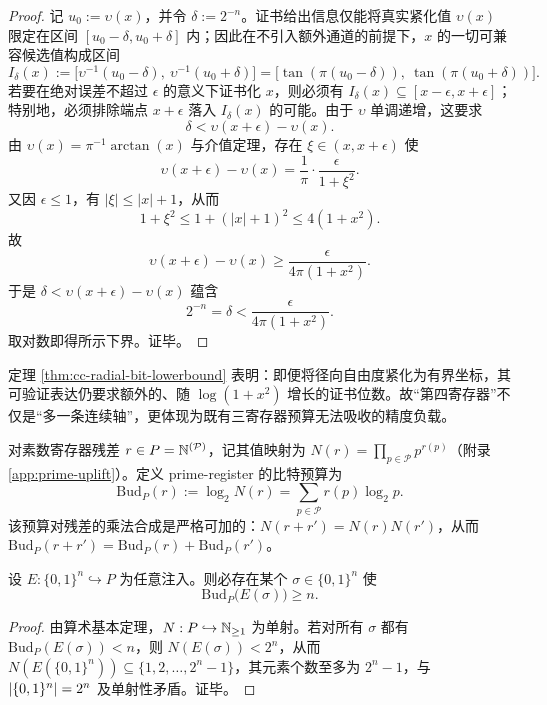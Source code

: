 \begin{proof}
记 $u_0:=\upsilon(x)$，并令 $\delta:=2^{-n}$。证书给出信息仅能将真实紧化值 $\upsilon(x)$ 限定在区间 $[u_0-\delta,u_0+\delta]$ 内；因此在不引入额外通道的前提下，$x$ 的一切可兼容候选值构成区间
$$
I_\delta(x):=\bigl[\upsilon^{-1}(u_0-\delta),\ \upsilon^{-1}(u_0+\delta)\bigr]
=\bigl[\tan(\pi(u_0-\delta)),\ \tan(\pi(u_0+\delta))\bigr].
$$
若要在绝对误差不超过 $\epsilon$ 的意义下证书化 $x$，则必须有 $I_\delta(x)\subseteq[x-\epsilon,x+\epsilon]$；特别地，必须排除端点 $x+\epsilon$ 落入 $I_\delta(x)$ 的可能。由于 $\upsilon$ 单调递增，这要求
$$
\delta < \upsilon(x+\epsilon)-\upsilon(x).
$$
由 $\upsilon(x)=\pi^{-1}\arctan(x)$ 与介值定理，存在 $\xi\in(x,x+\epsilon)$ 使
$$
\upsilon(x+\epsilon)-\upsilon(x)=\frac{1}{\pi}\cdot\frac{\epsilon}{1+\xi^2}.
$$
又因 $\epsilon\le 1$，有 $|\xi|\le |x|+1$，从而
$$
1+\xi^2\le 1+(|x|+1)^2\le 4(1+x^2).
$$
故
$$
\upsilon(x+\epsilon)-\upsilon(x)\ge \frac{\epsilon}{4\pi(1+x^2)}.
$$
于是 $\delta<\upsilon(x+\epsilon)-\upsilon(x)$ 蕴含
$$
2^{-n}=\delta < \frac{\epsilon}{4\pi(1+x^2)}.
$$
取对数即得所示下界。证毕。
\end{proof}

\begin{remark}
定理 \ref{thm:cc-radial-bit-lowerbound} 表明：即便将径向自由度紧化为有界坐标，其可验证表达仍要求额外的、随 $\log(1+x^2)$ 增长的证书位数。故“第四寄存器”不仅是“多一条连续轴”，更体现为既有三寄存器预算无法吸收的精度负载。
\end{remark}

\begin{definition}\label{def:cc-prime-budget}
对素数寄存器残差 $r\in P=\mathbb{N}^{(\mathcal{P})}$，记其值映射为 $N(r)=\prod_{p\in\mathcal{P}}p^{r(p)}$（附录 \ref{app:prime-uplift}）。定义 prime-register 的比特预算为
$$
\mathrm{Bud}_P(r):=\log_2 N(r)=\sum_{p\in\mathcal{P}} r(p)\log_2 p.
$$
该预算对残差的乘法合成是严格可加的：$N(r+r')=N(r)N(r')$，从而 $\mathrm{Bud}_P(r+r')=\mathrm{Bud}_P(r)+\mathrm{Bud}_P(r')$。
\end{definition}

\begin{proposition}[注入编码的容量下界]\label{prop:cc-prime-budget-lowerbound}
设 $E:\{0,1\}^n\hookrightarrow P$ 为任意注入。则必存在某个 $\sigma\in\{0,1\}^n$ 使
$$
\mathrm{Bud}_P\bigl(E(\sigma)\bigr)\ge n.
$$
\end{proposition}

\begin{proof}
由算术基本定理，$N:P\hookrightarrow\mathbb{N}_{\ge 1}$ 为单射。若对所有 $\sigma$ 都有 $\mathrm{Bud}_P(E(\sigma))<n$，则 $N(E(\sigma))<2^n$，从而 $N(E(\{0,1\}^n))\subseteq\{1,2,\dots,2^n-1\}$，其元素个数至多为 $2^n-1$，与 $\left\lvert \{0,1\}^n\right\rvert=2^n$ 及单射性矛盾。证毕。
\end{proof}

